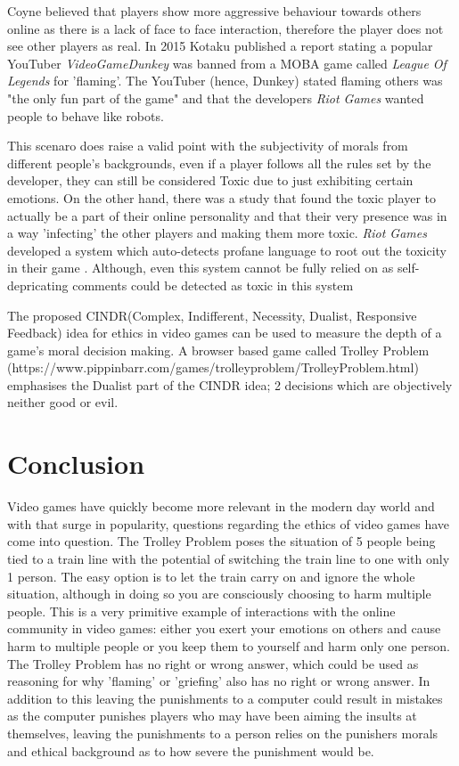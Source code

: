 \documentclass[12pt]{article}
\begin{document}
Coyne believed that players show more aggressive behaviour towards others online as there is a lack of face to face interaction, therefore the player does not see other players as real. In 2015 Kotaku \cite{hernandez_2015} published a report stating a popular YouTuber \textit{VideoGameDunkey} was banned from a MOBA game called \textit{League Of Legends} \cite{leagueoflegends} for 'flaming'. The YouTuber (hence, Dunkey) stated flaming others was "the only fun part of the game" and that the developers \textit{Riot Games} wanted people to behave like robots.

This scenaro does raise a valid point with the subjectivity of morals from different people's backgrounds, even if a player follows all the rules set by the developer, they can still be considered Toxic \cite{Kwak:2014:UTB:2567948.2580066} due to just exhibiting certain emotions. On the other hand, there was a study \cite{Neto:2017:STB:3106426.3106452} that found the toxic player to actually be a part of their online personality and that their very presence was in a way 'infecting' the other players and making them more toxic. \textit{Riot Games} developed a system which auto-detects profane language to root out the toxicity in their game \cite{Martens:2015:TDM:2984075.2984080}. Although, even this system cannot be fully relied on as self-depricating comments could be detected as toxic in this system \cite{Martens:2015:TDM:2984075.2984080}


The proposed CINDR(Complex, Indifferent, Necessity, Dualist, Responsive Feedback)\cite{7048084} idea for ethics in video games can be used to measure the depth of a game's moral decision making. A browser based game called Trolley Problem (https://www.pippinbarr.com/games/trolleyproblem/TrolleyProblem.html) emphasises the Dualist part of the CINDR idea; 2 decisions which are objectively neither good or evil. 


\section{Conclusion}
Video games have quickly become more relevant in the modern day world and with that surge in popularity, questions regarding the ethics of video games have come into question. The Trolley Problem \cite{7344559} poses the situation of 5 people being tied to a train line with the potential of switching the train line to one with only 1 person.
The easy option is to let the train carry on and ignore the whole situation, although in doing so you are consciously choosing to harm multiple people. This is a very primitive example of interactions with the online community in video games: either you exert your emotions on others and cause harm to multiple people or you keep them to yourself and harm only one person. 
The Trolley Problem has no right or wrong answer, which could be used as reasoning for why 'flaming' or 'griefing' also has no right or wrong answer. In addition to this leaving the punishments to a computer could result in mistakes as the computer punishes players who may have been aiming the insults at themselves, leaving the punishments to a person relies on the punishers morals and ethical background as to how severe the punishment would be.




\end{document}
